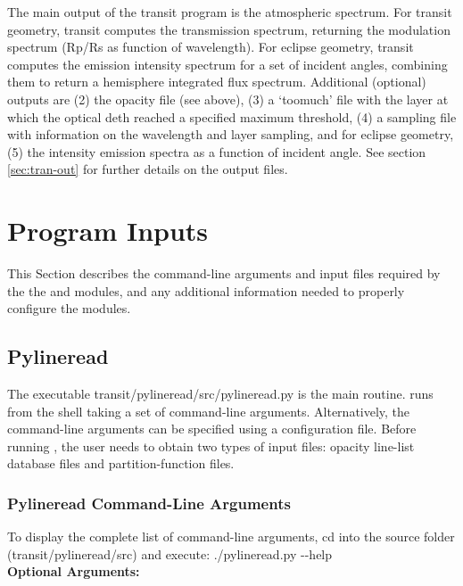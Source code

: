 \documentclass[letterpaper, 12pt]{article}
\begin{document}
The main output of the transit program is the atmospheric spectrum.
For transit geometry, transit computes the transmission spectrum,
returning the modulation spectrum (Rp/Rs as function of wavelength).
For eclipse geometry, transit computes the emission intensity spectrum
for a set of incident angles, combining them to return a hemisphere
integrated flux spectrum.  Additional (optional) outputs are (2) the
opacity file (see above), (3) a `toomuch' file with the layer at which
the optical deth reached a specified maximum threshold, (4) a sampling
file with information on the wavelength and layer sampling, and for
eclipse geometry, (5) the intensity emission spectra as a function of
incident angle.  See section \ref{sec:tran-out} for further details on
the output files.


\section{Program Inputs}
\label{sec:inputs}

This Section describes the command-line arguments and input files
required by the the {\pylineread} and {\transit} modules, and any
additional information needed to properly configure the modules.

\subsection{Pylineread}
\label{sec:inp-pyline}

The executable {\tttm transit/pylineread/src/pylineread.py} is the
main {\pylineread} routine.  {\pylineread} runs from the shell taking a
set of command-line arguments.  Alternatively, the command-line
arguments can be specified using a configuration file.  
Before running {\pylineread}, the user needs to obtain two types of
input files: opacity line-list database files and partition-function files.

\subsubsection{Pylineread Command-Line Arguments}

To display the complete list of command-line arguments, cd into the
{\pylineread} source folder ({\tttm transit/pylineread/src}) and
execute: \newline
{\tttb ./pylineread.py {-}{-}help} \\

{\bf Optional Arguments:} \newline
{}
\end{document}
